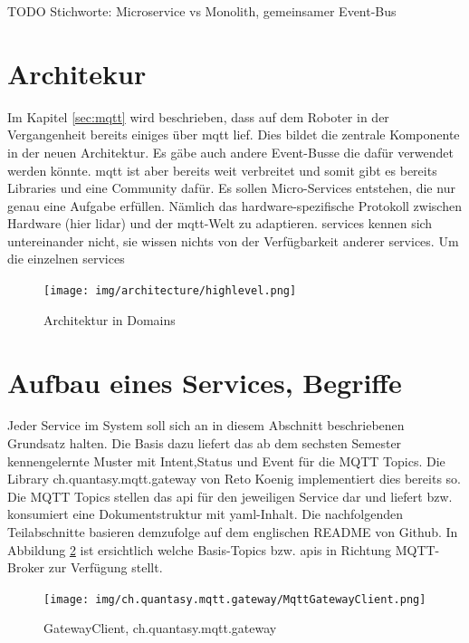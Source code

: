 \documentclass[11pt,english,german]{report}
\begin{document}
\bigskip
TODO
Stichworte: Microservice vs Monolith, gemeinsamer Event-Bus

\section{Architekur}
Im Kapitel \ref{sec:mqtt} wird beschrieben, dass auf dem Roboter in der Vergangenheit bereits einiges über \acrshort{mqtt} lief. Dies bildet die zentrale Komponente in der neuen Architektur. Es gäbe auch andere Event-Busse die dafür verwendet werden könnte. \acrshort{mqtt} ist aber bereits weit verbreitet und somit gibt es bereits Libraries und eine Community dafür. Es sollen Micro-Services entstehen, die nur genau eine Aufgabe erfüllen. Nämlich das hardware-spezifische Protokoll zwischen Hardware (hier \acrshort{lidar}) und der \acrshort{mqtt}-Welt zu adaptieren. \Glspl{service} kennen sich untereinander nicht, sie wissen nichts von der Verfügbarkeit anderer \glspl{service}. Um die einzelnen \Glspl{service}

\begin{figure}[H]
	\centering
	\texttt{[image: img/architecture/highlevel.png]}
	\caption{Architektur in Domains}
	\label{fig:architecture_highlevel}
\end{figure}


\section{Aufbau eines Services, Begriffe}
Jeder Service im System soll sich an in diesem Abschnitt beschriebenen Grundsatz halten. Die Basis dazu liefert das ab dem sechsten Semester kennengelernte Muster mit Intent,Status und Event für die MQTT Topics. Die Library ch.quantasy.mqtt.gateway\cite{ch.quantasy.mqtt.gateway} von Reto Koenig implementiert dies bereits so. Die MQTT Topics stellen das \acrshort{api} für den jeweiligen Service dar und liefert bzw. konsumiert eine Dokumentstruktur mit \acrshort{yaml}-Inhalt. Die nachfolgenden Teilabschnitte basieren demzufolge auf dem englischen README von Github\cite{ch.quantasy.mqtt.gateway}. In Abbildung \ref{fig:gatewayclient} ist ersichtlich welche Basis-Topics bzw. \acrshort{api}s in Richtung MQTT-Broker zur Verfügung stellt.

\begin{figure}[H]
	\centering
	\texttt{[image: img/ch.quantasy.mqtt.gateway/MqttGatewayClient.png]}
    \caption{GatewayClient, ch.quantasy.mqtt.gateway\cite{ch.quantasy.mqtt.gateway}}
    \label{fig:gatewayclient}
\end{figure}
\end{document}
